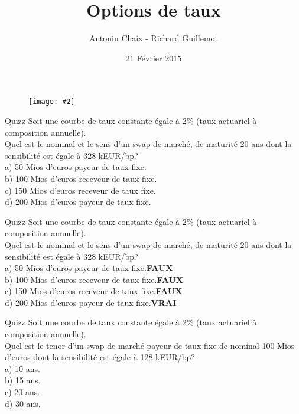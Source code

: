 \documentclass{beamer}
\title[Produits dérivés de taux]{Options de taux}
\author{Antonin Chaix - Richard Guillemot}
\institute{Master IFMA}
\date{21 Février 2015}
\newcommand{\FIG}[2]{\texttt{[image: \#2]}}
\begin{document}
\begin{frame}
\titlepage
\begin{figure}[h]
\centering \FIG{5cm}{figures/UPMC_IFMA.jpg}
\end{figure}

\end{frame}

\begin{frame}{Quizz}
Soit une courbe de taux constante égale à 2\% (taux actuariel à composition annuelle).\\
\vspace{0.5cm}
Quel est le nominal et le sens d'un swap de marché, de maturité 20 ans dont la sensibilité est égale à 328 kEUR/bp?\\
\vspace{0.5cm}
a) 50 Mios d'euros payeur de taux fixe.\\
b) 100 Mios d'euros receveur de taux fixe.\\
c) 150 Mios d'euros receveur de taux fixe.\\
d) 200 Mios d'euros payeur de taux fixe.\\
\end{frame}


\begin{frame}{Quizz}
Soit une courbe de taux constante égale à 2\% (taux actuariel à composition annuelle).\\
\vspace{0.5cm}
Quel est le nominal et le sens d'un swap de marché, de maturité 20 ans dont la sensibilité est égale à 328 kEUR/bp?\\
\vspace{0.5cm}
a) 50 Mios d'euros payeur de taux fixe.\textbf{\color{red}FAUX}\\
b) 100 Mios d'euros receveur de taux fixe.\textbf{\color{red}FAUX}\\
c) 150 Mios d'euros receveur de taux fixe.\textbf{\color{red}FAUX}\\
d) 200 Mios d'euros payeur de taux fixe.\textbf{\color{green}VRAI}\\
\end{frame}


\begin{frame}{Quizz}
Soit une courbe de taux constante égale à 2\% (taux actuariel à composition annuelle).\\
\vspace{0.5cm}
Quel est le tenor d'un swap de marché payeur de taux fixe de nominal 100 Mios d'euros dont la sensibilité est égale à 128 kEUR/bp?\\
\vspace{0.5cm}
a) 10 ans.\\
b) 15 ans.\\
c) 20 ans.\\
d) 30 ans.\\
\end{frame}
\end{document}
